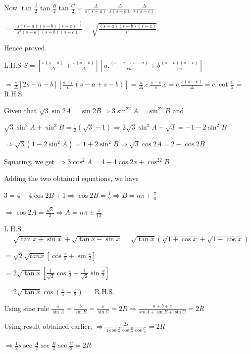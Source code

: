   Now $\tan\frac{A}{2}\tan\frac{B}{2}\tan\frac{C}{2} = \frac{\Delta}{s(s - a)}.\frac{\Delta}{s(s -
    b)}.\frac{\Delta}{s(s - c)}$

  $= \frac{\left[s(s - a)(s - b)(s - c)\right]^{\frac{3}{2}}}{s^3(s - a)(s - b)(s - c)} = \sqrt{\frac{(s -
      a)(s - b)(s - c)}{s^3}}$.

  Hence proved.
\item L.H.S $S = \left[\frac{s(s - a)}{\Delta} + \frac{s(s - b)}{\Delta}\right]\left[a.\frac{(s - c)(s -
    a)}{ca} + b\frac{(s - b)(s - c)}{bc}\right]$

  $= \frac{s}{\Delta}[2s - a - b]\left[\frac{s - c}{c}(s - a + s - b)\right] = \frac{s}{\Delta}.c.\frac{s -
  c}{c}.c = c.\frac{s(s - c)}{\Delta} = c.\cot\frac{C}{2} =$ R.H.S.
\item Given that $\sqrt{3}\sin2A = \sin2B\Rightarrow 3\sin^22A = \sin^22B$ and

  $\sqrt{3}\sin^2A + \sin^2B = \frac{1}{2}(\sqrt{3} - 1)\Rightarrow 2\sqrt{3}\sin^2A - \sqrt{3} = - 1 -
  2\sin^2B$

  $\Rightarrow \sqrt{3}\left(1 - 2\sin^2A\right) = 1 + 2\sin^2B \Rightarrow \sqrt{3}\cos2A = 2 - \cos2B$

  Squaring, we get $\Rightarrow 3\cos^2A = 4 - 4\cos2x + \cos^22B$

  Adding the two obtained equations, we have

  $3 = 4 - 4\cos2B + 1 \Rightarrow \cos2B = \frac{1}{2}\Rightarrow B = n\pi \pm\frac{\pi}{6}$

  $\Rightarrow \cos2A = \frac{\sqrt{3}}{2}\Rightarrow A = n\pi \pm\frac{\pi}{12}$.
\item L.H.S. $= \sqrt{\tan x + \sin x} + \sqrt{\tan x - \sin x} = \sqrt{\tan x}(\sqrt{1 + \cos x} + \sqrt{1
  - \cos x})$

  $= \sqrt{2}\sqrt{tan x}\left[\cos\frac{x}{2} + \sin\frac{x}{2}\right]$

  $= 2\sqrt{\tan x}\left[\frac{1}{\sqrt{2}}\cos\frac{x}{2} + \frac{1}{\sqrt{2}}\sin\frac{x}{2}\right]$

  $= 2\sqrt{\tan x}\cos\left(\frac{\pi}{4} - \frac{x}{2}\right) =$ R.H.S.
\item Using sine rule $\frac{a}{\sin A} = \frac{b}{\sin B} = \frac{c}{\sin C} = 2R \Rightarrow \frac{a + b +
  c}{sin A + \sin B + \sin C} = 2R$

  Using result obtained earlier, $\Rightarrow \frac{2s}{4\cos\frac{A}{2}\cos\frac{B}{2}\cos\frac{C}{2}} =
  2R$

  $\Rightarrow \frac{1}{2}s\sec\frac{A}{2}\sec\frac{B}{2}\sec\frac{C}{2} = 2R$

